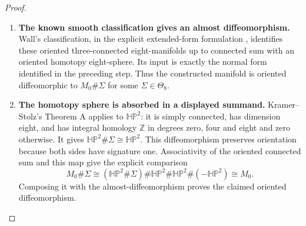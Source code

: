 \begin{proof}
\begin{enumerate}[label=\arabic*.]
\item \textbf{The known smooth classification gives an almost
diffeomorphism.}
Wall's classification, in the explicit extended-form formulation
\cite[Definition 3.6, pp.~12--13, and Theorem 3.7(1),
pp.~13--14]{IVVWallForm}, identifies these oriented
three-connected eight-manifolds up to connected sum with an
oriented homotopy eight-sphere.  Its input is exactly the normal
form identified in the preceding step.  Thus the constructed
manifold is oriented diffeomorphic to $M_0\#\Sigma$ for some
$\Sigma\in\Theta_8$.

\item \textbf{The homotopy sphere is absorbed in a displayed
summand.}
Kramer--Stolz's Theorem A
\cite[Theorem A, p.~178]{IVVKramerStolz} applies to
$\mathbb{HP}^2$: it is simply connected, has dimension eight,
and has integral homology $\mathbb Z$ in degrees zero, four
and eight and zero otherwise.  It gives
$\mathbb{HP}^2\#\Sigma\cong\mathbb{HP}^2$.
This diffeomorphism preserves orientation because both sides
have signature one.  Associativity of the oriented connected
sum and this map give the explicit comparison
\[
M_0\#\Sigma
\cong(\mathbb{HP}^2\#\Sigma)\#\mathbb{HP}^2
       \#\mathbb{HP}^2\#(-\mathbb{HP}^2)
\cong M_0.
\]
Composing it with the almost-diffeomorphism proves the claimed
oriented diffeomorphism.
\end{enumerate}
\end{proof}
